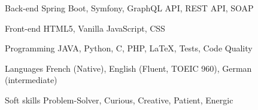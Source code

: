 

\begin{cvskills}

\cvskill
  {Back-end} %
  {Spring Boot, Symfony, GraphQL API, REST API, SOAP} %

  \cvskill
    {Front-end} %
    {HTML5, Vanilla JavaScript, CSS} %

  \cvskill
    {Programming} %
    {JAVA, Python, C, PHP, LaTeX, Tests, Code Quality} %

  \cvskill
    {Languages} %
    {French (Native), English (Fluent, TOEIC 960), German (intermediate)} %

  \cvskill
    {Soft skills} %
    {Problem-Solver, Curious, Creative, Patient, Energic } %

\end{cvskills}
